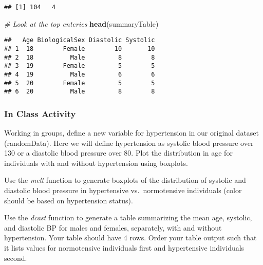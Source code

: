 \documentclass[
]{article}
\newenvironment{Shaded}{\begin{snugshade}}{\end{snugshade}}
\newcommand{\CommentTok}[1]{\textcolor[rgb]{0.56,0.35,0.01}{\textit{#1}}}
\newcommand{\FunctionTok}[1]{\textcolor[rgb]{0.13,0.29,0.53}{\textbf{#1}}}
\newcommand{\NormalTok}[1]{#1}
\begin{document}
\begin{verbatim}
## [1] 104   4
\end{verbatim}

\begin{Shaded}
\begin{Highlighting}[]
\CommentTok{\# Look at the top enteries}
\FunctionTok{head}\NormalTok{(summaryTable)}
\end{Highlighting}
\end{Shaded}

\begin{verbatim}
##   Age BiologicalSex Diastolic Systolic
## 1  18        Female        10       10
## 2  18          Male         8        8
## 3  19        Female         5        5
## 4  19          Male         6        6
## 5  20        Female         5        5
## 6  20          Male         8        8
\end{verbatim}

\subsubsection{In Class Activity}\label{in-class-activity}

Working in groups, define a new variable for hypertension in our
original dataset (randomData). Here we will define hypertension as
systolic blood pressure over 130 or a diastolic blood pressure over 80.
Plot the distribution in age for individuals with and without
hypertension using boxplots.

Use the \emph{melt} function to generate boxplots of the distribution of
systolic and diastolic blood pressure in hypertensive vs.~normotensive
individuals (color should be based on hypertension status).

Use the \emph{dcast} function to generate a table summarizing the mean
age, systolic, and diastolic BP for males and females, separately, with
and without hypertension. Your table should have 4 rows. Order your
table output such that it lists values for normotensive individuals
first and hypertensive individuals second.
\end{document}
